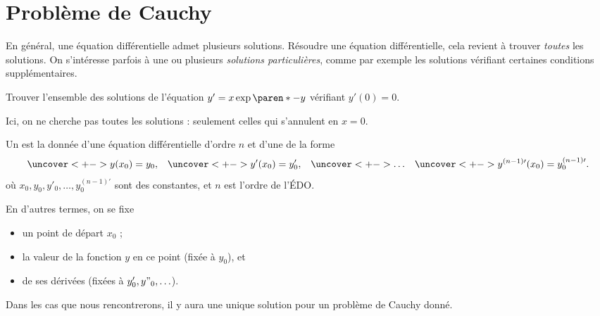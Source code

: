 \section{Problème de Cauchy}
\begin{frame}
  \begin{remark*}
  En général, une équation différentielle admet plusieurs solutions.\pause{} Résoudre une équation différentielle, cela revient à trouver \emph{toutes} les solutions.\pause{} On s'intéresse parfois à une ou plusieurs \emph{solutions particulières},\pause{} comme par exemple les solutions vérifiant certaines conditions supplémentaires.
\end{remark*}\pause{}

\begin{example}\pause{}
  Trouver l'ensemble des solutions de l'équation \(y' = x \exp{\paren*{-y}}\) vérifiant \(y'(0) = 0\).\pause{}

  Ici, on ne cherche pas toutes les solutions : seulement celles qui s'annulent en \(x = 0\).
\end{example}
\end{frame}
\begin{frame}
\begin{definition}
  Un  est la donnée d'une équation différentielle d'ordre \(n\) et\pause{} d'une  de la forme\pause{}
  \begin{equation*}
      \uncover<+->{y(x_{0}) = y_{0},}\quad
      \uncover<+->{y'(x_{0}) = y'_{0},}\quad
      \uncover<+->{\ldots}\quad
      \uncover<+->{y^{(n-1)\prime}(x_{0}) = y^{(n-1)\prime}_{0}.}
  \end{equation*}
  où \(x_{0}, y_{0}, y'_{0}, \ldots, y^{(n-1)\prime}_{0}\) sont des constantes, et \(n\) est l'ordre de l'ÉDO.\pause{}
\end{definition}\pause{}
\begin{remark*}
  En d'autres termes, on se fixe\pause{}
  \begin{itemize}
  \item un point de départ \(x_{0}\) ;\pause{}
  \item la valeur de la fonction \(y\) en ce point\pause{} (fixée à \(y_{0}\)), et\pause{}
  \item de ses dérivées\pause{} (fixées à \(y'_{0}, y"_{0}, \ldots\)).
  \end{itemize}
\end{remark*}\pause{}

\begin{remark*}\pause{}
  Dans les cas que nous rencontrerons,\pause{} il y aura une unique solution pour un problème de Cauchy donné.
\end{remark*}
\end{frame}

